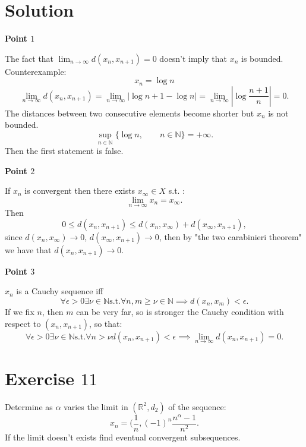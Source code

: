 \documentclass[a4paper, twoside, openany]{book}
\begin{document}
\section*{Solution}
\textbf{Point $1$} \par
The fact that $\lim_{n \rightarrow \infty} d(x_n, x_{n+1}) = 0$ doesn't imply that $x_n$ is bounded. Counterexample:
$$x_n = \log{n}$$
$$\lim_{n \rightarrow \infty} d(x_n, x_{n+1}) = \lim_{n \rightarrow \infty} |\log{n+1} - \log{n}| = \lim_{n \rightarrow \infty} |\log{\frac{n + 1}{n}}| = 0.$$
The distances between two consecutive elements become shorter but $x_n$ is not bounded.
$$\sup_{n \in \mathbb{N}} \{ \log{n}, \qquad n \in \mathbb{N} \} = +\infty.$$
Then the first statement is false. \par  
\textbf{Point $2$} \par  
If $x_n$ is convergent then there exists $x_{\infty} \in X$ s.t. :
$$\lim_{n \rightarrow \infty} x_n = x_{\infty}.$$
Then
$$0 \leq d(x_n, x_{n+1}) \leq d(x_n, x_{\infty}) + d(x_{\infty}, x_{n+1}),$$
since $d(x_n, x_{\infty}) \rightarrow 0$, $d(x_{\infty}, x_{n+1}) \rightarrow 0$, then by "the two carabinieri theorem" we have that $d(x_n, x_{n+1}) \rightarrow 0$. \par
\textbf{Point $3$} \par  
$x_n$ is a Cauchy sequence iff
$$\forall \epsilon > 0 \exists \nu \in \mathbb{N} \textrm{s.t.} \forall n, m \geq \nu \in \mathbb{N} \implies d(x_n, x_m) < \epsilon.$$
If we fix $n$, then $m$ can be very far, so is stronger the Cauchy condition with respect to $(x_n, x_{n+1})$, so that:
$$\forall \epsilon > 0 \exists \nu \in \mathbb{N} \textrm{s.t.} \forall n > \nu d(x_n, x_{n+1}) < \epsilon \implies \lim_{n \rightarrow \infty} d(x_n , x_{n+1}) = 0.$$
\clearpage
\section*{Exercise $11$}
Determine as $\alpha$ varies the limit in $(\mathbb{R}^2, d_2)$ of the sequence:
$$x_n = (\frac{1}{n}, (-1)^n \frac{n^{\alpha} - 1}{n^2}.$$
If the limit doesn't exists find eventual convergent subsequences.
\end{document}
